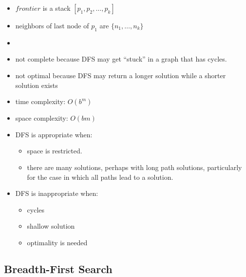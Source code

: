 \documentclass{article}
\begin{document}
\begin{itemize}
    \item $frontier$ is a stack $[p_1, p_2, \ldots, p_k]$
    \item neighbors of last node of $p_1$ are $\{n_1, \ldots, n_k\}$
    \item
    \begin{algorithmic}
            \EndIf
        \EndWhile
    \end{algorithmic}
    \item not complete because DFS may get ``stuck'' in a graph that has cycles.
    \item not optimal because DFS may return a longer solution while a shorter solution exists
    \item time complexity: $O(b^m)$
    \item space complexity: $O(bm)$
    \item DFS is appropriate when:
        \begin{itemize}
            \item space is restricted.
            \item there are many solutions, perhaps with long path solutions, particularly for the case in which all paths lead to a solution.
        \end{itemize}
    \item DFS is inappropriate when:
        \begin{itemize}
            \item cycles
            \item shallow solution
            \item optimality is needed
        \end{itemize}
\end{itemize}

\subsection{Breadth-First Search}
\end{document}
